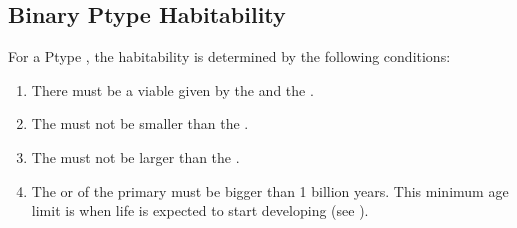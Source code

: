 \documentclass[letterpaper,10pt,english]{sphinxmanual}
\begin{document}
\subsection{Binary P\sphinxhyphen{}type Habitability}
\label{\detokenize{quantities/habitability/binary_p_type_habitability:binary-p-type-habitability}}\label{\detokenize{quantities/habitability/binary_p_type_habitability::doc}}\label{\detokenize{quantities/habitability/binary_p_type_habitability:id1}}
\sphinxAtStartPar
For a P\sphinxhyphen{}type {\hyperref[\detokenize{celestial_systems/binary_system:id1}]{}}, the habitability is determined by the following conditions:
\begin{enumerate}
%
\item {} 
\sphinxAtStartPar
There must be a viable {\hyperref[\detokenize{quantities/habitability/habitable_zones/average_habitable_zone:id1}]{}} given by the {\hyperref[\detokenize{quantities/insolation_models/relaxed_minimum_limit:id1}]{}} and the {\hyperref[\detokenize{quantities/insolation_models/relaxed_maximum_limit:id1}]{}}.

\item {} 
\sphinxAtStartPar
The {\hyperref[\detokenize{quantities/insolation_models/relaxed_maximum_limit:id1}]{}} must not be smaller than the {\hyperref[\detokenize{quantities/children_orbit_limits/inner_orbit_limit:id1}]{}}.

\item {} 
\sphinxAtStartPar
The {\hyperref[\detokenize{quantities/insolation_models/relaxed_minimum_limit:id1}]{}} must not be larger than the {\hyperref[\detokenize{quantities/children_orbit_limits/outer_orbit_limit:id1}]{}}.

\item {} 
\sphinxAtStartPar
The {\hyperref[\detokenize{quantities/life/lifetime:id1}]{}} or {\hyperref[\detokenize{quantities/life/age:id1}]{}} of the primary {\hyperref[\detokenize{celestial_bodies/star:id1}]{}} must be bigger than 1 billion years. This minimum age limit is when life is expected to start developing (see ).

\end{enumerate}
\end{document}
